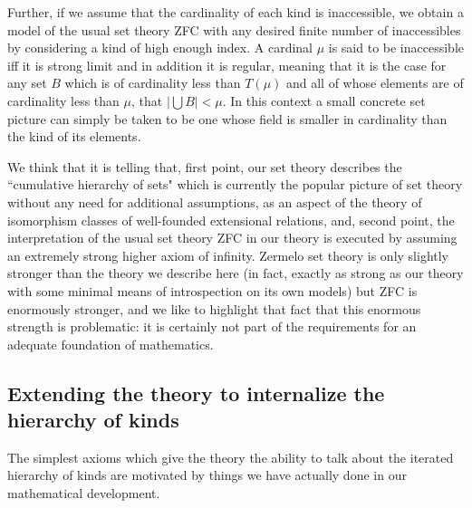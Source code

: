 \documentclass[12pt]{article}
\begin{document}
\begin{description}
Further, if we assume that the cardinality of each kind is inaccessible, we obtain a model of the usual set theory ZFC with any desired  finite number of inaccessibles by considering a kind of high enough index.  A cardinal $\mu$ is said to be inaccessible iff it is strong limit and in addition it is regular, meaning that it is the case for any set $B$ which is of cardinality less than $T(\mu)$ and all of whose elements are of cardinality less than $\mu$, that $|\bigcup B| < \mu$.  In this context a small concrete set picture can simply be taken to be one whose field is smaller in cardinality than the kind of its elements. 

We think that it is telling that, first point, our set theory describes the ``cumulative hierarchy of sets" which is currently the popular picture of set theory without any need for additional assumptions, as an aspect of the theory of isomorphism classes of well-founded extensional relations, and, second point, the interpretation of the usual set theory ZFC in our theory is executed by assuming an extremely strong higher axiom of infinity.  Zermelo set theory is only slightly stronger than the theory we describe here (in fact, exactly as strong as our theory with some minimal means of introspection on its own models) but ZFC is enormously stronger, and we like to highlight that fact that this enormous strength is problematic:  it is certainly not  part of the requirements for an adequate foundation of mathematics.

\end{description}

\newpage

\subsection{Extending the theory to internalize the hierarchy of kinds}

The simplest axioms which give the theory the ability to talk about the iterated hierarchy of kinds are motivated by things we have actually done in our mathematical development.
\end{document}
